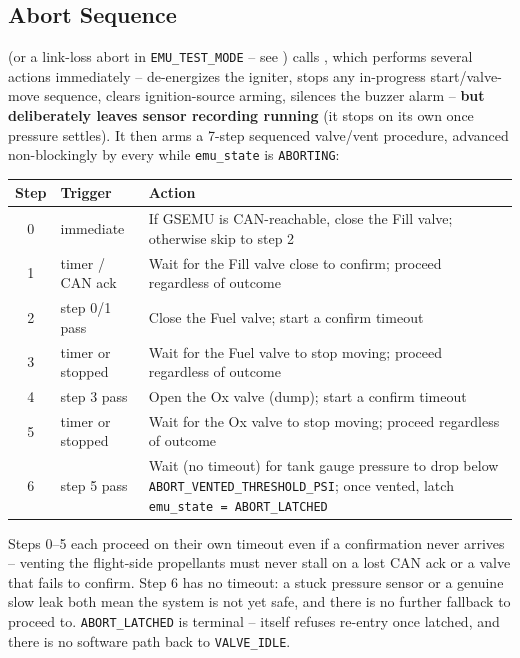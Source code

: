 ﻿\documentclass[11pt,letterpaper]{article}
\begin{document}
\subsection{Abort Sequence}

 (or a link-loss abort in \texttt{EMU\_TEST\_MODE} -- see
) calls , which performs
several actions immediately -- de-energizes the igniter, stops any
in-progress start/valve-move sequence, clears ignition-source arming,
silences the buzzer alarm -- \textbf{but deliberately leaves sensor
recording running} (it stops on its own once pressure settles). It then
arms a 7-step sequenced valve/vent procedure, advanced non-blockingly by
 every  while \texttt{emu\_state}
is \texttt{ABORTING}:

\begin{center}
\begin{tabular}{@{}clp{8.5cm}@{}}
\toprule
Step & Trigger & Action \\
\midrule
0 & immediate     & If GSEMU is CAN-reachable, close the Fill valve; otherwise skip to step 2 \\
1 & timer / CAN ack & Wait for the Fill valve close to confirm; proceed regardless of outcome \\
2 & step 0/1 pass & Close the Fuel valve; start a confirm timeout \\
3 & timer or stopped & Wait for the Fuel valve to stop moving; proceed regardless of outcome \\
4 & step 3 pass   & Open the Ox valve (dump); start a confirm timeout \\
5 & timer or stopped & Wait for the Ox valve to stop moving; proceed regardless of outcome \\
6 & step 5 pass   & Wait (no timeout) for tank gauge pressure to drop below \texttt{ABORT\_VENTED\_THRESHOLD\_PSI}; once vented, latch \texttt{emu\_state = ABORT\_LATCHED} \\
\bottomrule
\end{tabular}
\end{center}

Steps 0--5 each proceed on their own timeout even if a confirmation never
arrives -- venting the flight-side propellants must never stall on a lost
CAN ack or a valve that fails to confirm. Step 6 has no timeout: a stuck
pressure sensor or a genuine slow leak both mean the system is not yet
safe, and there is no further fallback to proceed to.
\texttt{ABORT\_LATCHED} is terminal --  itself
refuses re-entry once latched, and there is no software path back to
\texttt{VALVE\_IDLE}.
\end{document}
